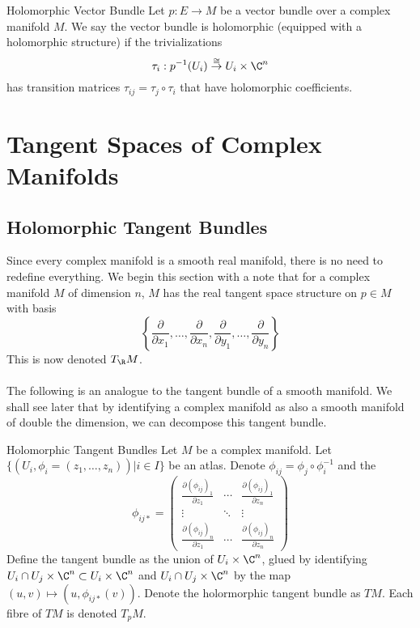 \documentclass[a4paper]{article}
\begin{document}
\begin{defn}{Holomorphic Vector Bundle}{} Let $p:E\to M$ be a vector bundle over a complex manifold $M$. We say the vector bundle is holomorphic (equipped with a holomorphic structure) if the trivializations $$\tau_i:p^{-1}(U_i)\overset{\cong}{\to}U_i\times\C^n$$ has transition matrices $\tau_{ij}=\tau_j\circ\tau_i$ that have holomorphic coefficients. 
\end{defn}

\pagebreak
\section{Tangent Spaces of Complex Manifolds}
\subsection{Holomorphic Tangent Bundles}
Since every complex manifold is a smooth real manifold, there is no need to redefine everything. We begin this section with a note that for a complex manifold $M$ of dimension $n$, $M$ has the real tangent space structure on $p\in M$ with basis $$\left\{\frac{\partial}{\partial x_1},\dots,\frac{\partial}{\partial x_n},\frac{\partial}{\partial y_1},\dots,\frac{\partial}{\partial y_n}\right\}$$ This is now denoted $T_{\R}M$. \\~\\

The following is an analogue to the tangent bundle of a smooth manifold. We shall see later that by identifying a complex manifold as also a smooth manifold of double the dimension, we can decompose this tangent bundle. 

\begin{defn}{Holomorphic Tangent Bundles}{} Let $M$ be a complex manifold. Let $\{(U_i,\phi_i=(z_1,\dots,z_n))|i\in I\}$ be an atlas. Denote $\phi_{ij}=\phi_j\circ\phi_i^{-1}$ and the $$\phi_{ij\ast}=\begin{pmatrix}
\frac{\partial (\phi_{ij})_1}{\partial z_1} & \cdots & \frac{\partial (\phi_{ij})_1}{\partial z_n}\\
\vdots & \ddots & \vdots\\
\frac{\partial (\phi_{ij})_n}{\partial z_1} & \cdots & \frac{\partial (\phi_{ij})_n}{\partial z_n}
\end{pmatrix}$$ Define the tangent bundle as the union of $U_i\times\C^n$, glued by identifying $U_i\cap U_j\times\C^n\subset U_i\times\C^n$ and $U_i\cap U_j\times\C^n$ by the map $(u,v)\mapsto(u,\phi_{ij\ast}(v))$. Denote the holormorphic tangent bundle as $TM$. Each fibre of $TM$ is denoted $T_pM$. 
\end{defn}
\end{document}
